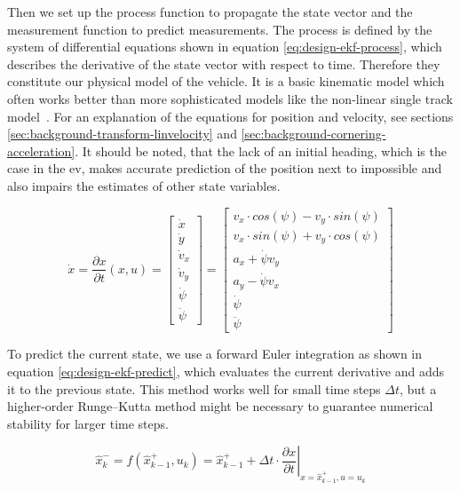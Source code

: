 Then we set up the process function to propagate the state vector and the measurement function to predict measurements. The process is defined by the system of differential equations shown in equation \ref{eq:design-ekf-process}, which describes the derivative of the state vector with respect to time. Therefore they constitute our physical model of the vehicle. It is a basic kinematic model which often works better than more sophisticated models like the non-linear single track model~\cite{AlexanderWischnewski.2019}. For an explanation of the equations for position and velocity, see sections \ref{sec:background-transform-linvelocity} and \ref{sec:background-cornering-acceleration}. It should be noted, that the lack of an initial heading, which is the case in the \gls{ev}, makes accurate prediction of the position next to impossible and also impairs the estimates of other state variables.

\begin{equation}\label{eq:design-ekf-process}%
\dot{x} = \frac{\partial x}{\partial t} (x, u)%
= \begin{bmatrix}\dot{x} \\ \dot{y} \\ \dot{v}_x \\ \dot{v}_y \\ \dot{\psi} \\ \ddot{\psi}\end{bmatrix}%
= \begin{bmatrix}v_x \cdot cos(\psi) - v_y \cdot sin(\psi) \\ v_x \cdot sin(\psi) + v_y \cdot cos(\psi) \\ a_x + \dot{\psi}v_y \\ a_y - \dot{\psi}v_x \\ \dot{\psi} \\ \ddot{\psi}\end{bmatrix}%
\end{equation}

To predict the current state, we use a forward Euler integration as shown in equation \ref{eq:design-ekf-predict}, which evaluates the current derivative and adds it to the previous state. This method works well for small time steps $\Delta t$, but a higher-order Runge--Kutta method might be necessary to guarantee numerical stability for larger time steps. 

\begin{equation}\label{eq:design-ekf-predict}%
\hat{x}_k^- = f(\hat{x}_{k-1}^+, u_k) = \hat{x}_{k-1}^+ + \Delta t \cdot \left. \frac{\partial x}{\partial t} \right|_{x = \hat{x}_{k-1}^+, u=u_k}%
\end{equation}

